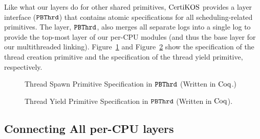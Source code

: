 Like what our layers do for other shared primitives, $\mathrm{CertiKOS}$ provides a layer interface (${{\mathrm{\texttt{PBThrd}}}}$)
that contains atomic specifications for all scheduling-related primitives. 
The layer, ${{\mathrm{\texttt{PBThrd}}}}$, also merges all separate logs 
into a single log to provide the top-most layer of our per-CPU modules (and thus the base layer for our multithreaded linking).
Figure~\ref{fig:chapter:certikos:proc-create-cpu-spec} and Figure~\ref{fig:chapter:certikos:thread-yield-cpu-spec} show the specification of the thread creation primitive and the specification of the thread yield primitive, respectively.

\begin{figure}
 
\caption{Thread Spawn Primitive Specification in ${{\mathrm{\texttt{PBThrd}}}}$ (Written in $\mathrm{Coq}$.)}
\label{fig:chapter:certikos:proc-create-cpu-spec}
\end{figure}


\begin{figure}
 
\caption{Thread Yield Primitive Specification in ${{\mathrm{\texttt{PBThrd}}}}$ (Written in $\mathrm{Coq}$).}
\label{fig:chapter:certikos:thread-yield-cpu-spec} 
\end{figure}


\subsection{Connecting All per-CPU layers}
\label{chapter:certikos:subsec:connecting-all-per-cpu-layers}

